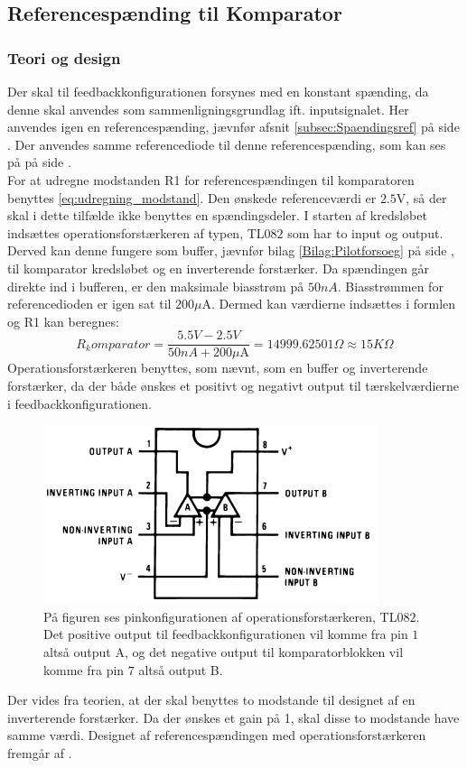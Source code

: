 \subsection{Referencespænding til Komparator}\label{subsec:Spaendingsref_Komparator}
\subsubsection{Teori og design}
Der skal til feedbackkonfigurationen forsynes med en konstant spænding, da denne skal anvendes som sammenligningsgrundlag ift. inputsignalet. Her anvendes igen en referencespænding, jævnfør afsnit \ref{subsec:Spaendingsref} på side \pageref{subsec:Spaendingsref}. Der anvendes samme referencediode til denne referencespænding, som kan ses på  på side \pageref{subsec:Spaendingsref}. \\
For at udregne modstanden R1 for referencespændingen til komparatoren benyttes \eqref{eq:udregning_modstand}. Den ønskede referenceværdi er $2.5$V, så der skal i dette tilfælde ikke benyttes en spændingsdeler. I starten af kredsløbet indsættes operationsforstærkeren af typen, TL$082$ som har to input og output. \cite{Corporation2013} Derved kan denne fungere som buffer, jævnfør bilag \ref{Bilag:Pilotforsoeg} på side \pageref{Bilag:Pilotforsoeg}, til komparator kredsløbet og en inverterende forstærker.\cite{Schaumann2014} Da spændingen går direkte ind i bufferen, er den maksimale biasstrøm på $50nA$. Biasstrømmen for referencedioden er igen sat til $200\mu$A. Dermed kan værdierne indsættes i formlen og R1 kan beregnes:
\begin{equation}
R_komparator = \frac{5.5V-2.5V}{50nA + 200\mu\text{A}} = 14999.62501\Omega \approx 15K\Omega 
\end{equation} 
Operationsforstærkeren benyttes, som nævnt, som en buffer og inverterende forstærker, da der både ønskes et positivt og negativt output til tærskelværdierne i feedbackkonfigurationen.
\begin{figure}[H]
	\centering
	\includegraphics[scale=0.65]{figures/cProblemloesning/TL082.PNG}
	\caption{På figuren ses pinkonfigurationen af operationsforstærkeren, TL$082$. Det positive output til feedbackkonfigurationen vil komme fra pin $1$ altså output A, og det negative output til komparatorblokken vil komme fra pin $7$ altså output B. \cite{Corporation2013}}
	\label{fig:TL082}
\end{figure}
\noindent Der vides fra teorien, at der skal benyttes to modstande til designet af en inverterende forstærker. Da der ønskes et gain på 1, skal disse to modstande have samme værdi. \cite{Nilsson2011} Designet af referencespændingen med operationsforstærkeren fremgår af .

